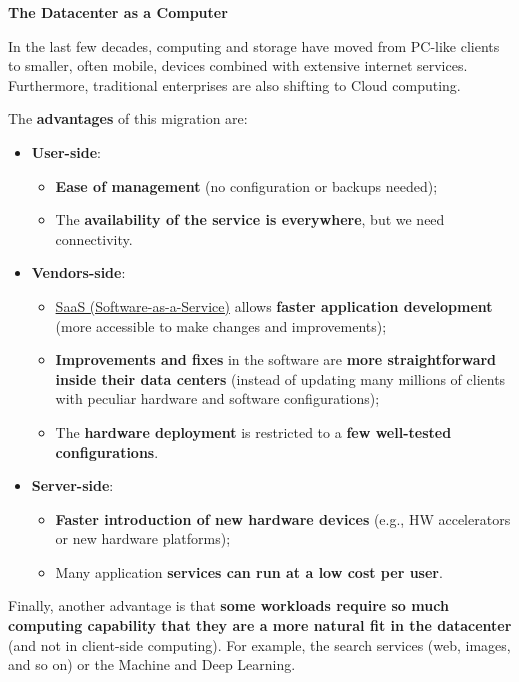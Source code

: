 \documentclass[a4paper]{article}
\newcommand{\example}[1]{\textcolor{Green4}{\textbf{#1}}}
\newcommand{\highspace}{\vspace{1.2em}\noindent}
\begin{document}
    \newpage

    \begin{center}
        \textcolor{Red2}{\textbf{The Datacenter as a Computer}}
    \end{center}

    \noindent
    In the last few decades, computing and storage have moved from PC-like clients to smaller, often mobile, devices combined with extensive internet services. Furthermore, traditional enterprises are also shifting to Cloud computing.

    \highspace
    The \example{advantages} of this migration are:
    \begin{itemize}
        \item \textbf{User-side}:
        \begin{itemize}
            \item \textbf{Ease of management} (no configuration or backups needed);
            
            \item The \textbf{availability of the service is everywhere}, but we need connectivity.
        \end{itemize}
        
        \item \textbf{Vendors-side}:
        \begin{itemize}
            \item \href{https://en.wikipedia.org/wiki/Software_as_a_service}{SaaS (Software-as-a-Service)} allows \textbf{faster application development} (more accessible to make changes and improvements);

            \item \textbf{Improvements and fixes} in the software are \textbf{more straightforward inside their data centers} (instead of updating many millions of clients with peculiar hardware and software configurations);
            
            \item The \textbf{hardware deployment} is restricted to a \textbf{few well-tested configurations}.
        \end{itemize} 

        \item \textbf{Server-side}:
        \begin{itemize}
            \item \textbf{Faster introduction of new hardware devices} (e.g., HW accelerators or new hardware platforms);

            \item Many application \textbf{services can run at a low cost per user}.
        \end{itemize}
    \end{itemize}
    Finally, another advantage is that \textbf{some workloads require so much computing capability that they are a more natural fit in the datacenter} (and not in client-side computing). For example, the search services (web, images, and so on) or the Machine and Deep Learning.
\end{document}
